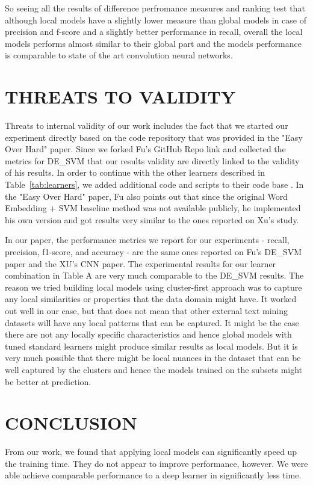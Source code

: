 \documentclass[sigconf]{acmart}
\theoremstyle{break}
\begin{document}
    So seeing all the results of difference perfromance measures and ranking test that although local models have a slightly lower measure than global models in case of precision and f-score and a slightly better performance in recall, overall the local models performs almost similar to their global part and the models performance is comparable to state of the art convolution neural networks.
    
    
\section{THREATS TO VALIDITY}
\label{sect:THREATS TO VALIDITY}
    Threats to internal validity of our work includes the fact that we started our experiment directly based on the code repository that was provided in the "Easy Over Hard" paper. Since we forked Fu's GitHub Repo link and collected the metrics for DE\_SVM that  our results validity are directly linked to the validity of his results. In order to continue with the other learners described in Table~\ref{tab:learners}, we added additional code and scripts to their code base . In the "Easy Over Hard" paper, Fu also points out that since the original Word Embedding + SVM baseline method was not available publicly, he implemented his own version and got results very similar to the ones reported on Xu's study. 
    
    In our paper, the performance metrics we report for our experiments - recall, precision, f1-score, and accuracy - are the same ones reported on Fu's DE\_SVM paper and the XU's CNN  paper. The experimental results for our learner combination in Table A are very much comparable to the DE\_SVM results. The reason we tried building local models using cluster-first approach was to capture any local similarities or properties that the data domain might have. It worked out well in our case, but that does not mean that other external text mining datasets will have any local patterns that can be captured. It might be the case there are not any locally specific characteristics and hence global models with tuned standard learners might produce similar results as local models. But it is very much possible that there might be local nuances in the dataset that can be well captured by the clusters and hence the models trained on the subsets might be better at prediction.


\section{CONCLUSION}
\label{sect:CONCLUSION}
    From our work, we found that applying local models can significantly speed up the training time. They do not appear to improve performance, however. We were able achieve comparable performance to a deep learner in significantly less time.
    
\end{document}
